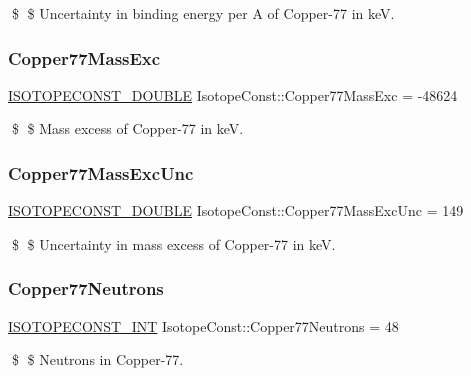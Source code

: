 \$ \$ Uncertainty in binding energy per A of Copper-\/77 in keV. \mbox{\label{group___isotope_const-_copper-_cu77_ga1ed85ca1181f03ffe8fb77dee7dfca95}} 
\subsubsection{\texorpdfstring{Copper77\+Mass\+Exc}{Copper77MassExc}}
{\footnotesize\ttfamily \mbox{\hyperlink{group___isotope_const-_macros_ga8f45a7272ce02c0b4c65c44636ed719a}{I\+S\+O\+T\+O\+P\+E\+C\+O\+N\+S\+T\+\_\+\+D\+O\+U\+B\+LE}} Isotope\+Const\+::\+Copper77\+Mass\+Exc = -\/48624}

\$ \$ Mass excess of Copper-\/77 in keV. \mbox{\label{group___isotope_const-_copper-_cu77_ga1d7fc596246cfa89e3ceba535ec1847d}} 
\subsubsection{\texorpdfstring{Copper77\+Mass\+Exc\+Unc}{Copper77MassExcUnc}}
{\footnotesize\ttfamily \mbox{\hyperlink{group___isotope_const-_macros_ga8f45a7272ce02c0b4c65c44636ed719a}{I\+S\+O\+T\+O\+P\+E\+C\+O\+N\+S\+T\+\_\+\+D\+O\+U\+B\+LE}} Isotope\+Const\+::\+Copper77\+Mass\+Exc\+Unc = 149}

\$ \$ Uncertainty in mass excess of Copper-\/77 in keV. \mbox{\label{group___isotope_const-_copper-_cu77_gaa6d8b9e214c55946e8f69bb8a0518c28}} 
\subsubsection{\texorpdfstring{Copper77\+Neutrons}{Copper77Neutrons}}
{\footnotesize\ttfamily \mbox{\hyperlink{group___isotope_const-_macros_ga5f18360b3e99483a35c32d789e62621c}{I\+S\+O\+T\+O\+P\+E\+C\+O\+N\+S\+T\+\_\+\+I\+NT}} Isotope\+Const\+::\+Copper77\+Neutrons = 48}

\$ \$ Neutrons in Copper-\/77. \mbox{\label{group___isotope_const-_copper-_cu77_gabeba4d2d1942b6d287c0b271afd48027}} 
